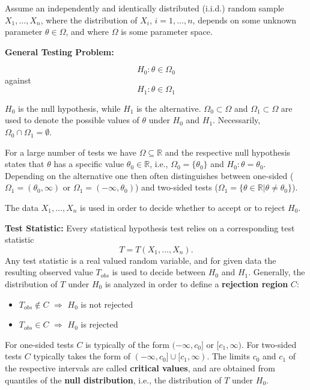 \documentclass[
]{book}
\providecommand{\tightlist}{%
  \setlength{\itemsep}{0pt}\setlength{\parskip}{0pt}}
\begin{document}
Assume an independently and identically distributed (i.i.d.) random sample \(X_1,\dots,X_n\), where the distribution of \(X_i\), \(i=1,\dots,n\), depends on some unknown parameter \(\theta\in\Omega\), and where \(\Omega\) is some parameter space.

\hfill\break

\textbf{General Testing Problem:}

\[H_0:\theta\in\Omega_0\]
against
\[H_1:\theta\in\Omega_1\]

\(H_0\) is the null hypothesis, while \(H_1\) is the alternative. \(\Omega_0\subset\Omega\) and \(\Omega_1\subset\Omega\) are used to denote the possible values of \(\theta\) under \(H_0\) and \(H_1\). Necessarily, \(\Omega_0\cap\Omega_1=\emptyset\).

For a large number of tests we have \(\Omega\subseteq\mathbb{R}\) and the respective null hypothesis states that \(\theta\) has a specific value \(\theta_0\in\mathbb{R}\), i.e., \(\Omega_0=\{\theta_0\}\) and \(H_0:\theta=\theta_0\). Depending on the alternative one then often distinguishes between one-sided (\(\Omega_1=(\theta_0,\infty)\) or \(\Omega_1=(-\infty,\theta_0)\)) and two-sided tests (\(\Omega_1=\{\theta\in\mathbb{R}|\theta\neq \theta_0\}\)).

\hfill\break

The data \(X_1,\dots,X_n\) is used in order to decide whether to accept or to reject \(H_0\).

\hfill\break

\textbf{Test Statistic:}
Every statistical hypothesis test relies on a corresponding test statistic
\[T=T(X_1,\dots,X_n).\]
Any test statistic is a real valued random variable, and for given data the resulting observed value \(T_{obs}\) is used to decide between
\(H_0\) and \(H_1\). Generally, the distribution of \(T\) under \(H_0\) is analyzed in order to define a \textbf{rejection region} \(C\):

\begin{itemize}
\tightlist
\item
  \(T_{obs}\not\in C\) \(\Rightarrow\) \(H_0\) is not rejected
\item
  \(T_{obs}\in C\) \(\Rightarrow\) \(H_0\) is rejected
\end{itemize}

For one-sided tests \(C\) is typically of the form \((-\infty,c_0]\) or \([c_1,\infty)\).
For two-sided tests \(C\) typically takes the form of \((-\infty,c_0]\cup [c_1,\infty)\).
The limits \(c_0\) and \(c_1\) of the respective intervals are called \textbf{critical values},
and are obtained from quantiles of the \textbf{null distribution}, i.e., the distribution of \(T\) under \(H_0\).
\end{document}
